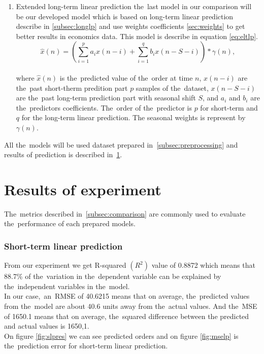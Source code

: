 \begin{enumerate}
    \item Extended long-term linear prediction
     the~last model in our comparison will be our developed model which is based on long-term linear prediction
    describe in \ref{subsec:longlp} and use weights coefficients \ref{sec:weights} to get better results in
    economics data. This model is describe in equation \ref{eq:eltlp}.
    \begin{equation}
        \hat{x}(n) = \left(\sum_{i=1}^{p} a_i x(n-i) + \sum_{i=1}^{q} b_i x(n-S-i)\right) * \gamma(n),
    \end{equation}
    \\
    where $\hat{x}(n)$ is the~predicted value of the~order at time $n$, $x(n-i)$ are the~past short-therm predition part $p$ samples of the~dataset, $x(n-S-i)$ are the~past long-term prediction part with seasonal shift $S$, and $a_i$ and $b_i$ are the~predictors coefficients. The~order of the~predictor is $p$ for short-term and $q$ for the long-term linear prediction. The seasonal weights is represent by $\gamma(n)$.\\
\end{enumerate}
All the~models will be used dataset prepared in~\ref{subsec:preprocessing} and results of prediction is
described in~\ref{subsec:experimentResults}.
\section{Results of experiment}\label{subsec:experimentResults}
    The~metrics described in~\ref{subsec:comparison} are commonly used to evaluate
     the~performance of each prepared models.
    \subsubsection{Short-term linear prediction} \label{subsec:res_slp}
    From our experiment we get R-squared $(R^2)$ value of 0.8872 which means that
    88.7\% of the~variation in the~dependent variable can be explained
    by the~independent variables in the~model.\\
    In our case,~an~RMSE of 40.6215 means that on average, the~predicted values
    from the~model are about 40.6 units away from the~actual values.
    And the~MSE of 1650.1 means that on average, the~squared difference between the
    predicted and actual values is 1650,1.\\
    On figure \ref{fig:slpres} we can see predicted orders and on figure \ref{fig:mselp}
    is the~prediction error for short-term linear prediction.

